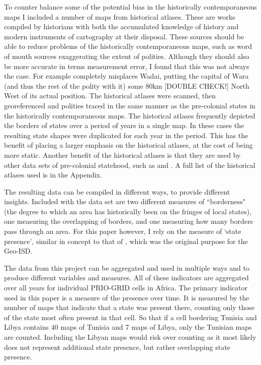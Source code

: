 \documentclass[12pt]{article}
\begin{document}

To counter balance some of the potential bias in the historically
contemporaneous maps I included a number of maps from historical atlases. These
are works compiled by historians with both the accumulated knowledge of history
and modern instruments of cartography at their disposal. These sources should be
able to reduce problems of the historically contemporaneous maps, such as word
of mouth sources exaggerating the extent of polities. Although they should also
be more accurate in terms measurement error, I found that this was not always
the case. For example \citep{Kasule1998} completely misplaces Wadai, putting the
capital of Wara (and thus the rest of the polity with it) some 80km [DOUBLE
CHECK!] North West of its actual position. The historical atlases were scanned,
then georeferenced and polities traced in the same manner as the pre-colonial
states in the historically contemporaneous maps. The historical atlases
frequently depicted the borders of states over a period of years in a single
map. In these cases the resulting state shapes were duplicated for each year in
the period. This has the benefit of placing a larger emphasis on the historical
atlases, at the cost of being more static. Another benefit of the historical
atlases is that they are used by other data sets of pre-colonial statehood, such
as \citet{Paine2019} and \citet{Depetris-Chauvin2016}. A full list of the
historical atlases used is in the Appendix.

The resulting data can be compiled in different ways, to provide different
insights. Included with the data set are two different measures of
``borderness" (the degree to which an area has historically been on the fringes
of local states), one measuring the overlapping of borders, and one measuring
how many borders pass through an area. For this paper however, I rely on the
measure of `state presence', similar in concept to that of
\citet{Depetris-Chauvin2016}, which was the original purpose for the Geo-ISD.

The data from this project can be aggregated and used in multiple ways and to
produce different variables and measures. All of these indicators are aggregated
over all years for individual PRIO-GRID cells in Africa. The primary indicator
used in this paper is a measure of the presence over time. It is measured by the
number of maps that indicate that a state was present there, counting only those
of the state most often present in that cell. So that if a cell bordering
Tunisia and Libya contains 40 maps of Tunisia and 7 maps of Libya, only the
Tunisian maps are counted. Including the Libyan maps would risk over counting as
it most likely does not represent additional state presence, but rather
overlapping state presence. 
\end{document}
